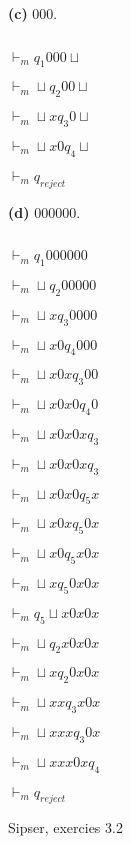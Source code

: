 \documentclass[11pt]{article}
\newcommand{\question}[2] {\vspace{.25in} \fbox{#1} #2 \vspace{.10in}}
\renewcommand{\part}[1] {\vspace{.10in} {\bf (#1)}}
\begin{document}
\begin{multicols}{4}

\part{c} 000.

$ $

$ \vdash_m q_1 0 0 0 \sqcup $

$ \vdash_m \sqcup q_2 0 0 \sqcup $

$ \vdash_m \sqcup x q_3 0 \sqcup $

$ \vdash_m \sqcup x 0 q_4 \sqcup $

$ \vdash_m q_{reject} $

\part{d} 000000.


$ $ 

$ \vdash_m q_1 0 0 0 0 0 0  $

$ \vdash_m \sqcup q_2 0 0 0 0 0 $

$ \vdash_m \sqcup x q_3 0 0 0 0 $

$ \vdash_m \sqcup x 0 q_4 0 0 0 $

$ \vdash_m \sqcup x 0 x q_3 0 0 $

$ \vdash_m \sqcup x 0 x 0 q_4 0 $

$ \vdash_m \sqcup x 0 x 0 x q_3 $

$ \vdash_m \sqcup x 0 x 0 x q_3 $

$ \vdash_m \sqcup x 0 x 0 q_5 x $

$ \vdash_m \sqcup x 0 x q_5 0 x $

$ \vdash_m \sqcup x 0 q_5 x 0 x $

$ \vdash_m \sqcup x q_5 0 x 0 x $

$ \vdash_m q_5 \sqcup x 0 x 0 x $

$ \vdash_m \sqcup q_2 x 0 x 0 x $

$ \vdash_m \sqcup x q_2 0 x 0 x $

$ \vdash_m \sqcup x x q_3 x 0 x $

$ \vdash_m \sqcup x x x q_3 0 x $

$ \vdash_m \sqcup x x x 0 x q_4 $

$ \vdash_m q_{reject} $

\end{multicols}

\question{5}{Sipser, exercies 3.2}
\end{document}
